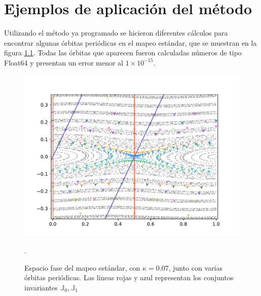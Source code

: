 
\chapter{Ejemplos de aplicación del método}

Utilizando el método ya programado se hicieron diferentes cálculos para encontrar algunas \'orbitas peri\'odicas en el mapeo est\'andar, que se muestran en la figura \ref{orbitasperiodicasestandarv}. Todas las \'orbitas que aparecen fueron calculadas n\'umeros de tipo \textrm{Float64} y presentan un error menor al $1\times10^{-15}$.
\begin{figure}[H]
	\centering
	\includegraphics[scale= 0.7]{EstandarOP07}
	\label{orbitasperiodicasestandarv}
	\caption{Espacio fase del mapeo est\'andar, con $\kappa = 0.07$, junto con varias \'orbitas peri\'odicas. Las lineas rojas y azul representan los conjuntos invariantes $\mathbb{J}_{0},\mathbb{J}_{1}$}.
\end{figure}
